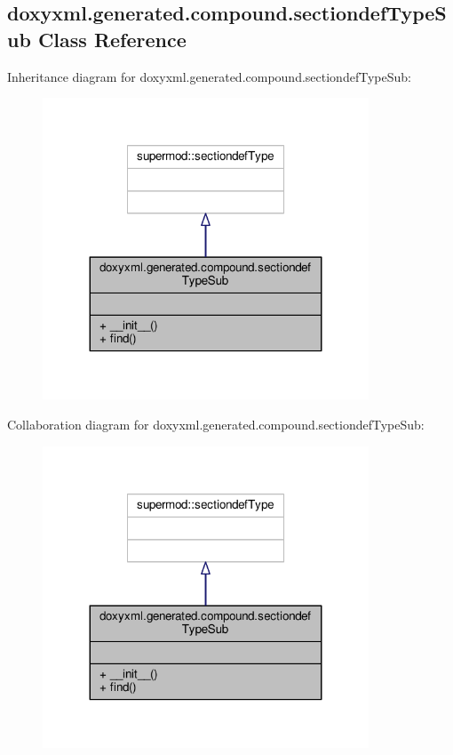 \subsection{doxyxml.\+generated.\+compound.\+sectiondef\+Type\+Sub Class Reference}
\label{classdoxyxml_1_1generated_1_1compound_1_1sectiondefTypeSub}


Inheritance diagram for doxyxml.\+generated.\+compound.\+sectiondef\+Type\+Sub\+:
\nopagebreak
\begin{figure}[H]
\begin{center}
\leavevmode
\includegraphics[width=275pt]{d1/dc2/classdoxyxml_1_1generated_1_1compound_1_1sectiondefTypeSub__inherit__graph}
\end{center}
\end{figure}


Collaboration diagram for doxyxml.\+generated.\+compound.\+sectiondef\+Type\+Sub\+:
\nopagebreak
\begin{figure}[H]
\begin{center}
\leavevmode
\includegraphics[width=275pt]{d7/d6b/classdoxyxml_1_1generated_1_1compound_1_1sectiondefTypeSub__coll__graph}
\end{center}
\end{figure}
